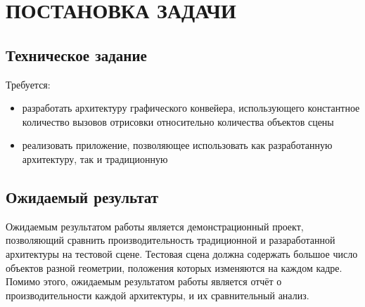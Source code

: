 \chapter{ПОСТАНОВКА ЗАДАЧИ} \label{ch1}

\section{Техническое задание} \label{ch1:sec1}
Требуется:
\begin{itemize}
	\item разработать архитектуру графического конвейера, использующего константное количество вызовов отрисовки относительно количества объектов сцены 
	\item реализовать приложение, позволяющее использовать как разработанную архитектуру, так и традиционную
\end{itemize}

\section{Ожидаемый результат} \label{ch1:sec2}
Ожидаемым результатом работы является демонстрационный проект, позволяющий сравнить производительность традиционной и разаработанной архитектуры на тестовой сцене. Тестовая сцена должна содержать большое число объектов разной геометрии, положения которых изменяются на каждом кадре. Помимо этого, ожидаемым результатом работы является отчёт о производительности каждой архитектуры, и их сравнительный анализ.






